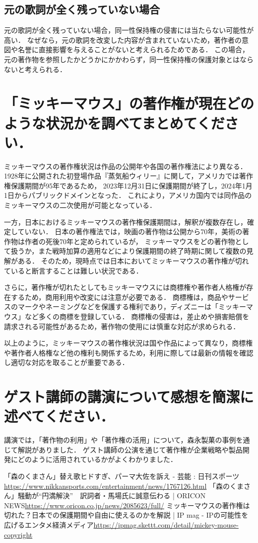 \documentclass[titlepage,a4paper]{jsarticle}
\begin{document}
\subsection*{元の歌詞が全く残っていない場合}
元の歌詞が全く残っていない場合，同一性保持権の侵害には当たらない可能性が高い．
なぜなら，元の歌詞を改変した内容が含まれていないため，著作者の意図や名誉に直接影響を与えることがないと考えられるためである．
この場合，元の著作物を参照したかどうかにかかわらず，同一性保持権の保護対象とはならないと考えられる．

\newpage
\section{「ミッキーマウス」の著作権が現在どのような状況かを調べてまとめてください．}
ミッキーマウスの著作権状況は作品の公開年や各国の著作権法により異なる．
1928年に公開された初登場作品『蒸気船ウィリー』に関して，アメリカでは著作権保護期間が95年であるため，
2023年12月31日に保護期間が終了し，2024年1月1日からパブリックドメインとなった．
これにより，アメリカ国内では同作品のミッキーマウスの二次使用が可能となっている．\cite{micky}

一方，日本におけるミッキーマウスの著作権保護期間は，解釈が複数存在し，確定していない．
日本の著作権法では，映画の著作物は公開から70年，美術の著作物は作者の死後70年と定められているが，
ミッキーマウスをどの著作物として扱うか，また戦時加算の適用などにより保護期間の終了時期に関して複数の見解がある．
そのため，現時点では日本においてミッキーマウスの著作権が切れていると断言することは難しい状況である．

さらに，著作権が切れたとしてもミッキーマウスには商標権や著作者人格権が存在するため，商用利用や改変には注意が必要である．
商標権は，商品やサービスのマークやネーミングなどを保護する権利であり，ディズニーは「ミッキーマウス」など多くの商標を登録している．
商標権の侵害は，差止めや損害賠償を請求される可能性があるため，著作物の使用には慎重な対応が求められる．

以上のように，ミッキーマウスの著作権状況は国や作品によって異なり，商標権や著作者人格権など他の権利も関係するため，利用に際しては最新の情報を確認し適切な対応を取ることが重要である．

\section{ゲスト講師の講演について感想を簡潔に述べてください．}
講演では，「著作物の利用」や「著作権の活用」について，森永製菓の事例を通じて解説がありました．
ゲスト講師の公演を通じて著作権が企業戦略や製品開発にどのように活用されているかがよくわかりました．

\newpage
\begin{thebibliography}{99}
  「森のくまさん」替え歌ヒドすぎ、パーマ大佐を訴え - 芸能 : 日刊スポーツ\url{https://www.nikkansports.com/entertainment/news/1767126.html}
  「森のくまさん」騒動が“円満解決”　訳詞者・馬場氏に誠意伝わる | ORICON NEWS\url{https://www.oricon.co.jp/news/2085623/full/}
  ミッキーマウスの著作権は切れた？日本での保護期間や自由に使えるのかを解説 | IP mag - IPの可能性を広げるエンタメ経済メディア\url{https://ipmag.skettt.com/detail/mickey-mouse-copyright}
\end{thebibliography}
\end{document}
